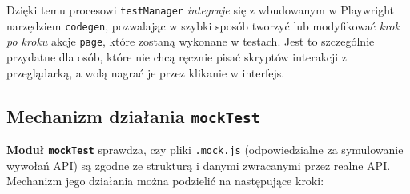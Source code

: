 \documentclass[12pt]{report}
\begin{document}
\noindent Dzięki temu procesowi \texttt{testManager} \emph{integruje} się z wbudowanym w Playwright narzędziem \texttt{codegen}, pozwalając w szybki sposób tworzyć lub modyfikować \emph{krok po kroku} akcje \texttt{page}, które zostaną wykonane w testach. Jest to szczególnie przydatne dla osób, które nie chcą ręcznie pisać skryptów interakcji z przeglądarką, a wolą nagrać je przez klikanie w interfejs.

\subsection{Mechanizm działania \texttt{mockTest}}
\label{sec:mechanizm-mocktest}

\textbf{Moduł \texttt{mockTest}} sprawdza, czy pliki \texttt{.mock.js} (odpowiedzialne za symulowanie wywołań API) są zgodne ze strukturą i danymi zwracanymi przez realne API. Mechanizm jego działania można podzielić na następujące kroki:
\end{document}
